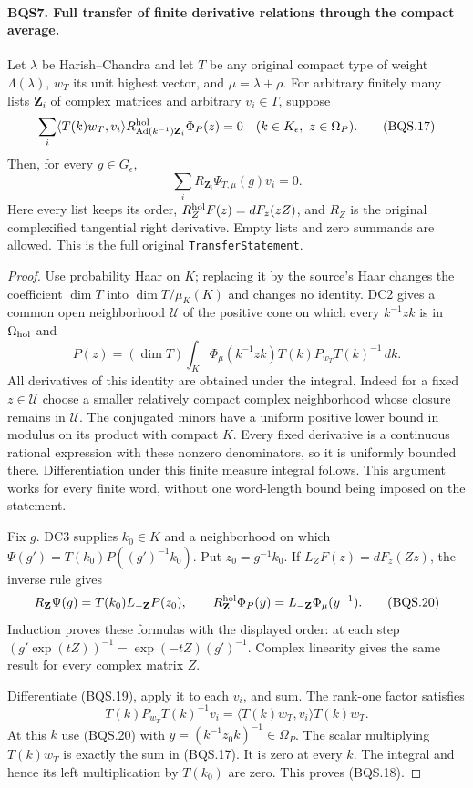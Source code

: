 \documentclass[11pt,a4paper]{article}
\numberwithin{equation}{section}
\theoremstyle{remark}\newtheorem{remark}[theorem]{Remark}
\begin{document}
\paragraph{BQS7. Full transfer of finite derivative relations through the compact average.}
\label{claim:BQS7}
Let $\lambda$ be Harish--Chandra and let $T$ be any original
compact type of weight $\Lambda(\lambda)$,
$w_T$ its unit highest vector, and $\mu=\lambda+\rho$.
For arbitrary finitely many lists $\mathbf Z_i$ of complex matrices
and arbitrary $v_i\in T$, suppose
\[
 \sum_i\langle T(k)w_T,v_i\rangle
       R^{\rm hol}_{\operatorname{Ad}(k^{-1})\mathbf Z_i}
                         \Phi_P(z)=0
 \quad(k\in K_\epsilon,\ z\in\Omega_P).
 \tag{BQS.17}
\]
Then, for every $g\in G_\epsilon$,
\[
                  \sum_i R_{\mathbf Z_i}\Psi_{T,\mu}(g)v_i=0.
 \tag{BQS.18}
\]
Here every list keeps its order, $R^{\rm hol}_ZF(z)=dF_z(zZ)$, and
$R_Z$ is the original complexified tangential right derivative.
Empty lists and zero summands are allowed.  This is the full original
\texttt{Transfer\allowbreak Statement}.

\begin{proof}
Use probability Haar on $K$; replacing it by the source's Haar changes
the coefficient $\dim T$ into $\dim T/\mu_K(K)$ and changes no identity.
DC2 gives a common open neighborhood $\mathcal U$ of the positive cone
on which every $k^{-1}zk$ is in $\Omega_{\rm hol}$ and
\[
 P(z)=(\dim T)\int_K\Phi_\mu(k^{-1}zk)
                 T(k)P_{w_T}T(k)^{-1}\,dk.
 \tag{BQS.19}
\]
All derivatives of this identity are obtained under the integral.
Indeed for a fixed $z\in\mathcal U$ choose a smaller relatively compact
complex neighborhood whose closure remains in $\mathcal U$.
The conjugated minors have a uniform positive lower bound in modulus
on its product with compact $K$.  Every fixed derivative is a continuous
rational expression with these nonzero denominators, so it is uniformly
bounded there.  Differentiation under this finite measure integral follows.
This argument works for every finite word, without one word-length bound
being imposed on the statement.

Fix $g$.  DC3 supplies $k_0\in K$ and a neighborhood on which
$\Psi(g')=T(k_0)P((g')^{-1}k_0)$.  Put $z_0=g^{-1}k_0$.
If $L_ZF(z)=dF_z(Zz)$, the inverse rule gives
\[
 R_{\mathbf Z}\Psi(g)
       =T(k_0)L_{-\mathbf Z}P(z_0),
 \qquad
 R^{\rm hol}_{\mathbf Z}\Phi_P(y)
       =L_{-\mathbf Z}\Phi_\mu(y^{-1}).
 \tag{BQS.20}
\]
Induction proves these formulas with the displayed order: at each
step $(g'\exp(tZ))^{-1}=\exp(-tZ)(g')^{-1}$.
Complex linearity gives the same result for every complex matrix $Z$.

Differentiate (BQS.19), apply it to each $v_i$, and sum.
The rank-one factor satisfies
\[
 T(k)P_{w_T}T(k)^{-1}v_i
             =\langle T(k)w_T,v_i\rangle T(k)w_T.
 \tag{BQS.21}
\]
At this $k$ use (BQS.20) with
$y=(k^{-1}z_0k)^{-1}\in\Omega_P$.
The scalar multiplying $T(k)w_T$ is exactly the sum in (BQS.17).
It is zero at every $k$.  The integral and hence its left multiplication
by $T(k_0)$ are zero.  This proves (BQS.18).
\end{proof}
\end{document}
